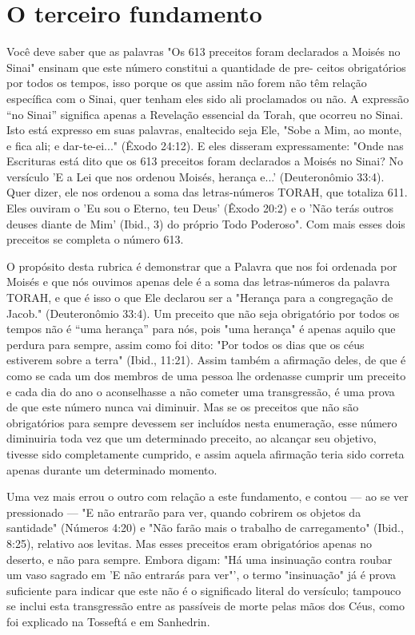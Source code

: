 \chapter*{O terceiro fundamento}

Você deve saber que as palavras "Os 613 preceitos foram declara­dos a
Moisés no Sinai" ensinam que este número constitui a quantidade de pre-
ceitos obrigatórios por todos os tempos, isso porque os que assim não
forem não têm relação específica com o Sinai, quer tenham eles sido ali
proclamados ou não. A expressão ``no Sinai'' significa apenas a Revelação
essencial da Torah, que ocorreu no Sinai. Isto está expresso em suas
palavras, enaltecido seja Ele, "Sobe a Mim, ao monte, e fica ali; e
dar-te-ei..." (Êxodo 24:12). E eles disseram expressamente: "Onde nas
Escrituras está dito que os 613 preceitos foram de­clarados a Moisés no
Sinai? No versículo 'E a Lei que nos ordenou Moisés, heran­ça e...'
(Deuteronômio 33:4). Quer dizer, ele nos ordenou a soma das
letras-nú­meros TORAH, que totaliza 611. Eles ouviram o 'Eu sou o
Eterno, teu Deus' (Êxo­do 20:2) e o 'Não terás outros deuses diante de
Mim' (Ibid., 3) do próprio Todo Poderoso". Com mais esses dois preceitos
se completa o número 613.

O propósito desta rubrica é demonstrar que a Palavra que nos foi
ordenada por Moisés e que nós ouvimos apenas dele é a soma das
letras-núme­ros da palavra TORAH, e que é isso o que Ele declarou ser a
"Herança para a congregação de Jacob." (Deuteronômio 33:4). Um preceito
que não seja obri­gatório por todos os tempos não é ``uma herança'' para
nós, pois "uma heran­ça" é apenas aquilo que perdura para sempre, assim
como foi dito: "Por todos os dias que os céus estiverem sobre a terra"
(Ibid., 11:21). Assim também a afir­mação deles, de que é como se cada
um dos membros de uma pessoa lhe orde­nasse cumprir um preceito e cada
dia do ano o aconselhasse a não cometer uma transgressão, é uma prova de
que este número nunca vai diminuir. Mas se os preceitos que não são
obrigatórios para sempre devessem ser incluídos nesta enumeração, esse
número diminuiria toda vez que um determinado preceito, ao alcançar seu
objetivo, tivesse sido completamente cumprido, e assim aquela afirmação
teria sido correta apenas durante um determinado momento.

Uma vez mais errou o outro com relação a este fundamento, e con­tou ---
ao se ver pressionado --- "E não entrarão para ver, quando cobrirem os
objetos da santidade" (Números 4:20) e "Não farão mais o trabalho de
carre­gamento" (Ibid., 8:25), relativo aos levitas. Mas esses preceitos
eram obrigató­rios apenas no deserto, e não para sempre. Embora digam:
"Há uma insinuação contra roubar um vaso sagrado em 'E não entrarás para
ver"', o termo "insi­nuação" já é prova suficiente para indicar que este
não é o significado literal do versículo; tampouco se inclui esta
transgressão entre as passíveis de morte pelas mãos dos Céus, como foi
explicado na Tosseftá e em Sanhedrin.

